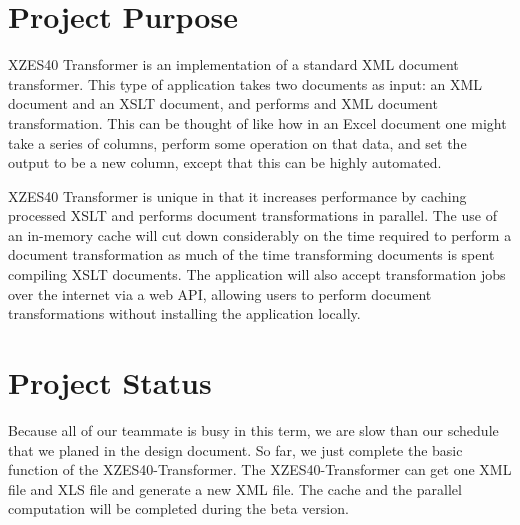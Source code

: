 \section{Project Purpose}

XZES40 Transformer is an implementation of a standard XML document transformer.
This type of application takes two documents as input: an XML document and an XSLT document, and performs and XML document transformation.
This can be thought of like how in an Excel document one might take a series of columns, perform some operation on that data, and set the output to be a new column, except that this can be highly automated.

XZES40 Transformer is unique in that it increases performance by caching processed XSLT and performs document transformations in parallel.
The use of an in-memory cache will cut down considerably on the time required to perform a document transformation as much of the time transforming documents is spent compiling XSLT documents.
The application will also accept transformation jobs over the internet via a web API, allowing users to perform document transformations without installing the application locally.

\section{Project Status}

Because all of our teammate is busy in this term, we are slow than our schedule that we planed in the design document. 
So far, we just complete the basic function of the XZES40-Transformer. The XZES40-Transformer can get one XML file and XLS file and generate a new XML file.
The cache and the parallel computation will be completed during the beta version.  




